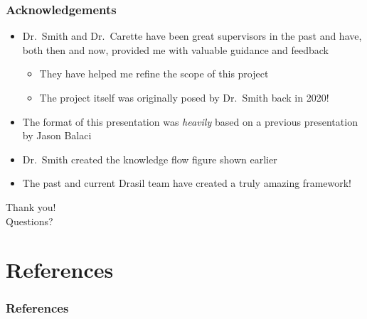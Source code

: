 \documentclass{beamer}
\begin{document}

\begin{frame}
    \frametitle{Acknowledgements}

    \begin{itemize}
        \item Dr.~Smith and Dr.~Carette have been great supervisors in the
              past and have, both then and now, provided me with valuable guidance
              and feedback
              \begin{itemize}
                  \item They have helped me refine the scope of this project
                  \item The project itself was originally posed by Dr.~Smith back
                        in 2020!
              \end{itemize}
        \item<2-> The format of this presentation was \emph{heavily} based on
              a previous presentation by Jason Balaci
        \item<2-> Dr.~Smith created the knowledge flow figure shown earlier
        \item<3-> The past and current Drasil team have created a truly amazing
              framework!
    \end{itemize}
\end{frame}


\begin{frame}
    \center
    \huge{Thank you!}\\
    \normalsize{Questions?}
\end{frame}


\section{References}

\begin{frame}%
    \frametitle{References}

    
    
\end{frame}
\end{document}
